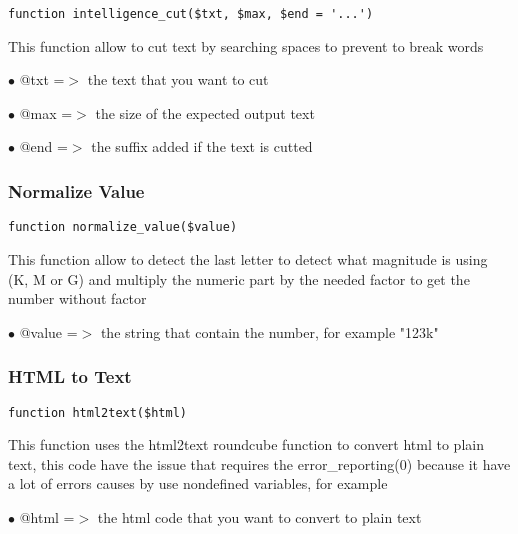 \documentclass[a4paper]{article}
\begin{document}
\begin{lstlisting}
function intelligence_cut($txt, $max, $end = '...')
\end{lstlisting}

This function allow to cut text by searching spaces to prevent to break words

\begin{compactitem}
\item[\color{myblue}$\bullet$] @txt =$>$ the text that you want to cut
\item[\color{myblue}$\bullet$] @max =$>$ the size of the expected output text
\item[\color{myblue}$\bullet$] @end =$>$ the suffix added if the text is cutted
\end{compactitem}

\hypertarget{toc244}{}
\subsubsection{Normalize Value}

\begin{lstlisting}
function normalize_value($value)
\end{lstlisting}

This function allow to detect the last letter to detect what magnitude is
using (K, M or G) and multiply the numeric part by the needed factor to
get the number without factor

\begin{compactitem}
\item[\color{myblue}$\bullet$] @value =$>$ the string that contain the number, for example "123k"
\end{compactitem}

\hypertarget{toc245}{}
\subsubsection{HTML to Text}

\begin{lstlisting}
function html2text($html)
\end{lstlisting}

This function uses the html2text roundcube function to convert html to
plain text, this code have the issue that requires the error\_reporting(0)
because it have a lot of errors causes by use nondefined variables, for
example

\begin{compactitem}
\item[\color{myblue}$\bullet$] @html =$>$ the html code that you want to convert to plain text
\end{compactitem}
\end{document}
